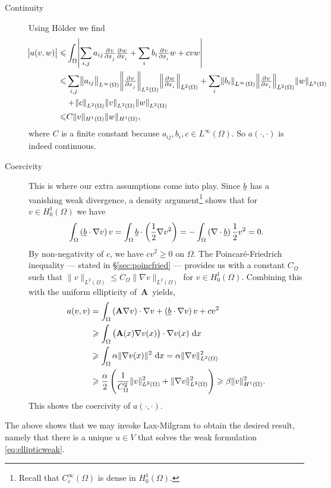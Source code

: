 \documentclass[thesis.tex]{subfiles}
\begin{document}
\begin{description}
  \item[Continuity]Using H\"older we find
    \begin{align*}
      \abs{a(v,w)} \leq &\int_\Omega \abs{\sum_{i,j} a_{ij} \pd{v}{x_j}\pd{w}{x_i}  + \sum_i b_i \pd{v}{x_i}w + cvw}\\
                   \leq &\sum_{i,j} \norm{ a_{ij}}_{L^\infty(\Omega)} \norm{ \pd{v}{x_j}}_{L^2(\Omega)} \norm{ \pd{w}{x_i}}_{L^2(\Omega)} + \sum_i \norm{b_i}_{L^\infty(\Omega)} \norm{\pd{v}{x_i}}_{L^2(\Omega)} \norm{w}_{L^2(\Omega)} \\
                   &+ \norm{c}_{L^2(\Omega)} \norm{v}_{L^2(\Omega)} \norm{w}_{L^2(\Omega)} \\
                   \leq &C \|v\|_{H^1(\Omega)} \|w\|_{H^1(\Omega)},
    \end{align*}
    where $C$ is a finite constant because $a_{ij}, b_i, c \in L^\infty(\Omega)$. So $a(\cdot,\cdot)$ is indeed continuous.
  \item[Coercivity] This is where our extra assumptions come into play. Since $\underline{b}$ has a vanishing weak divergence, a density argument\footnote{Recall that $C_c^\infty(\Omega)$ is dense in $H_0^1(\Omega)$.} shows that for $v \in H_0^1(\Omega)$ we have
    \[
      \int_\Omega \left(\underline{b} \cdot \nabla v\right)v  = \int_\Omega \underline{b} \cdot \left({1 \over 2} \nabla v^2\right) = - \int_\Omega \left(\nabla \cdot \underline{b} \right) {1 \over 2} v^2 = 0.
    \]
    By non-negativity of $c$, we have $cv^2 \geq 0$ on $\Omega$. 
    The Poincar\'e-Friedrich  inequality --- stated in \S\ref{sec:poincfried} --- provides us with a constant $C_\Omega$ such that $\|v\|_{L^2(\Omega)} \leq C_\Omega \|\nabla v\|_{L^2(\Omega)}$ for $v \in H_0^1(\Omega)$. Combining this with the uniform ellipticity of~$\mathbf{A}$~yields,
    \begin{align*}
      a(v,v) &= \int_\Omega \left(\mathbf{A} \nabla v\right) \cdot \nabla v + \left(\v{b} \cdot \nabla v\right)v + cv^2 \\
      &\geq  \int_\Omega \left(\mathbf{A}(x) \nabla v(x)\right) \cdot \nabla v(x)\, \dif x \\
             &\geq  \int_\Omega \alpha \|\nabla v(x)\|^2\, \dif x = \alpha \|\nabla v\|^2_{L^2(\Omega)}\\
             &\geq \frac{\alpha}{2} \left(\frac{1}{C^2_\Omega} \|v\|^2_{L^2(\Omega)} + \|\nabla v\|^2_{L^2(\Omega)}\right) \geq \beta \|v\|^2_{H^1(\Omega)}.
    \end{align*}
    This shows the coercivity of $a(\cdot, \cdot)$.
\end{description}
The above shows that we may invoke Lax-Milgram to obtain the desired result,
namely that there is a unique $u \in V$ that solves the weak formulation \eqref{eq:ellipticweak}. 
\end{document}
